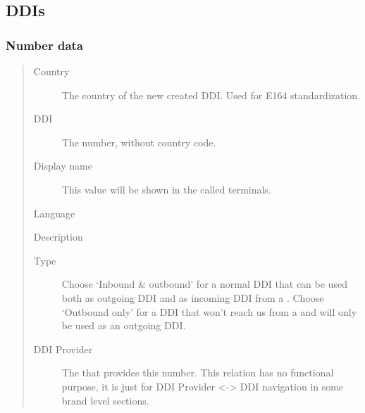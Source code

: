 \documentclass[letterpaper,10pt,english]{sphinxmanual}
\begin{document}
\subsection{DDIs}
\label{administration_portal/client/vpbx/ddis:ddis}\label{administration_portal/client/vpbx/ddis::doc}\label{administration_portal/client/vpbx/ddis:pbx-ddis}

\subsubsection{Number data}
\label{administration_portal/client/vpbx/ddis:number-data}\begin{quote}
\begin{description}
\item[{Country}] \leavevmode
The country of the new created DDI. Used for E164 standardization.

\item[{DDI}] \leavevmode
The number, without country code.

\item[{Display name}] \leavevmode
This value will be shown in the called terminals.

\end{description}

Language

Description
\begin{description}
\item[{Type}] \leavevmode
Choose `Inbound \& outbound' for a normal DDI that can be used both as outgoing DDI and as incoming DDI
from a {\hyperref[administration_portal/brand/providers/ddi_providers:ddi\string-providers]{}}. Choose `Outbound only' for a DDI that won't reach us from a
{\hyperref[administration_portal/brand/providers/ddi_providers:ddi\string-providers]{}} and will only be used as an outgoing DDI.

\item[{DDI Provider}] \leavevmode
The {\hyperref[administration_portal/brand/providers/ddi_providers:ddi\string-providers]{}} that provides this number. This relation has no functional purpose, it
is just for DDI Provider \textless{}-\textgreater{} DDI navigation in some brand level sections.

\end{description}
\end{quote}
\end{document}
